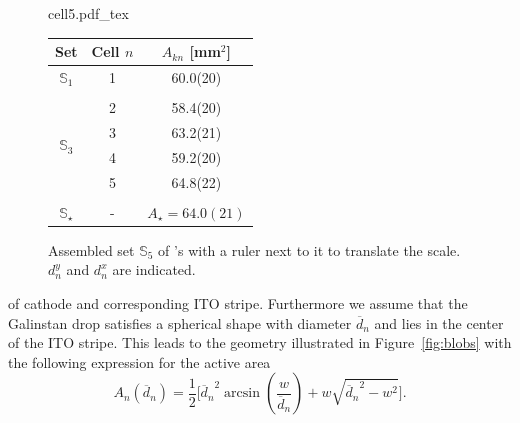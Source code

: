 \documentclass[a4paper,10pt,twocolumn]{article}
\begin{document}
\begin{extract*}
\begin{figure}[t]\centering
	\begin{minipage}{0.48\textwidth}\centering
			\def\svgwidth{0.9\textwidth}
			\caption{Assembled set $\mathbb{S}_5$ of \BHSC’s with a ruler next to it to translate the scale. $d_n^y$ and $d_n^x$ are indicated.}
			\label{fig:realblob}
			{cell5.pdf_tex}
	\end{minipage}
\hspace{4mm}
	\begin{minipage}{0.48\textwidth}\centering
		\vspace*{-1.5\baselineskip}
		\begin{tabular}{@{}ccc@{}}\toprule
			Set                             & Cell $n$ & $A_{kn}$ {[}mm$^2${]}     \\ \midrule
			$\mathbb{S}_1$                  & 1        & 60.0(20)                  \\
			&          &                           \\
			\multirow{4}{*}{$\mathbb{S}_3$} & 2        & 58.4(20)                  \\
			& 3        & 63.2(21)                  \\
			& 4        & 59.2(20)                  \\
			& 5        & 64.8(22)                  \\
			&          &                           \\
			$\mathbb{S}_\star$              & -        & $A_\star = 64.0(21)$ \\ \bottomrule
		\end{tabular}
	\end{minipage}
\end{figure}

\begin{multicols}{2}

of cathode and corresponding ITO stripe. Furthermore we assume that the Galinstan drop satisfies a spherical shape with diameter $\overline{d}_n$ and lies in the center of the ITO stripe. This leads to the geometry illustrated in Figure~\ref{fig:blobs} with the following expression for the active area
\begin{equation}\label{eq:blobarea}
	A_n({\overline{d}_n}) = \frac{1}{2} \Bigg[ {\overline{d}_n}^2 \arcsin\left(\frac{w}{{\overline{d}_n}}\right) + w \sqrt{{\overline{d}_n}^2 - w^2} \Bigg].
\end{equation}


\end{multicols}
\end{extract*}
\end{document}
